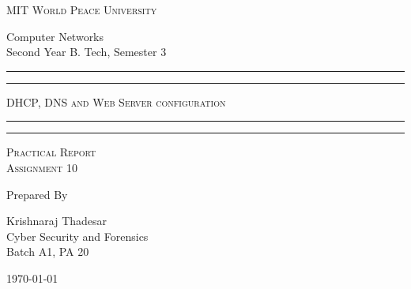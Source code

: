 \documentclass[11pt]{article}
\begin{document}
	
	\begin{titlepage} 
		\centering 
		
		
		\huge\textsc{
			MIT World Peace University
		}\\
	
		\vspace{0.75\baselineskip} %
		
		\LARGE{
			Computer Networks\\
			Second Year B. Tech, Semester 3
		}
		
		\vfill %
		
		
		\rule{\textwidth}{1.6pt}\vspace*{-\baselineskip}\vspace*{2pt}
		\rule{\textwidth}{0.6pt}
		\vspace{0.75\baselineskip} %
		
		
		
		\huge{\textsc{
			DHCP, DNS and Web Server configuration
			}} \\
		
		
		
		\vspace{0.5\baselineskip} %
		\rule{\textwidth}{0.6pt}\vspace*{-\baselineskip}\vspace*{2.8pt}
		\rule{\textwidth}{1.6pt}
		
		\vspace{1\baselineskip} %

			
		\LARGE\textsc{
			Practical Report\\
			Assignment 10
		} %
		\vfill
		
		
		Prepared By
		\vspace{0.5\baselineskip} %
		
		\Large{
			Krishnaraj Thadesar \\
			Cyber Security and Forensics\\
			Batch A1, PA 20
		}
		
		
		\vspace{0.5\baselineskip} %
		\today

	\end{titlepage}
	
\end{document}
